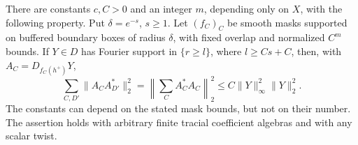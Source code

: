 \begin{lemma}\label{lem:ray-angular}
There are constants \(c,C>0\) and an integer \(m\), depending only on
\(X\), with the following property.  Put \(\delta=e^{-s}\), \(s\ge1\).
Let \((f_C)_C\) be smooth masks supported on buffered boundary boxes of
radius \(\delta\), with fixed overlap and normalized \(C^m\) bounds.
If \(Y\in D\) has Fourier support in \(\{r\ge l\}\), where
\(l\ge Cs+C\), then, with \(A_C=D_{f_C(h^+)}Y\),
\begin{equation}\label{eq:input-7}
 \sum_{C,D'}\|A_CA_{D'}^*\|_2^2
 =\left\|\sum_C A_C^*A_C\right\|_2^2
 \le C\|Y\|_\infty^2\|Y\|_2^2.
\end{equation}
The constants can depend on the stated mask bounds, but not on their
number.  The assertion holds with arbitrary finite tracial coefficient
algebras and with any scalar twist.
\end{lemma}

